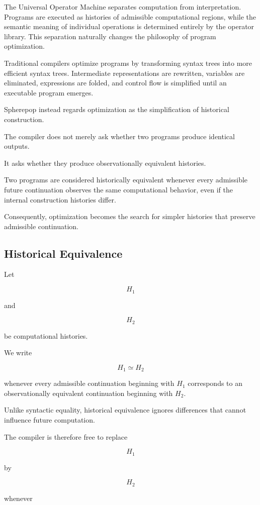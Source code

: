 \documentclass[12pt,oneside]{article}
\theoremstyle{definition}
\theoremstyle{remark}
\begin{document}
The Universal Operator Machine separates computation from interpretation.
Programs are executed as histories of admissible computational regions, while
the semantic meaning of individual operations is determined entirely by the
operator library. This separation naturally changes the philosophy of program
optimization.

Traditional compilers optimize programs by transforming syntax trees into more
efficient syntax trees. Intermediate representations are rewritten, variables
are eliminated, expressions are folded, and control flow is simplified until
an executable program emerges.

Spherepop instead regards optimization as the simplification of historical
construction.

The compiler does not merely ask whether two programs produce identical
outputs.

It asks whether they produce observationally equivalent histories.

Two programs are considered historically equivalent whenever every admissible
future continuation observes the same computational behavior, even if the
internal construction histories differ.

Consequently, optimization becomes the search for simpler histories that
preserve admissible continuation.

\subsection{Historical Equivalence}

Let

\[
H_1
\]

and

\[
H_2
\]

be computational histories.

We write

\[
H_1 \simeq H_2
\]

whenever every admissible continuation beginning with \(H_1\) corresponds to
an observationally equivalent continuation beginning with \(H_2\).

Unlike syntactic equality, historical equivalence ignores differences that
cannot influence future computation.

The compiler is therefore free to replace

\[
H_1
\]

by

\[
H_2
\]

whenever
\end{document}

